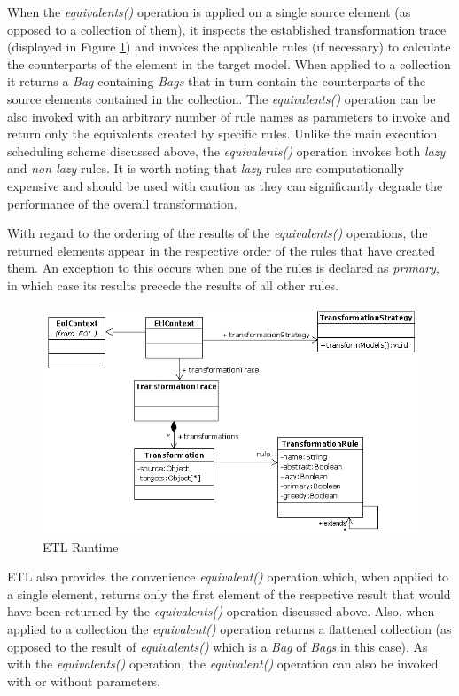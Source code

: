 When the \emph{equivalents()} operation is applied on a single source element (as opposed to a collection of them), it inspects the established transformation trace (displayed in Figure \ref{fig:EtlRuntime}) and invokes the applicable rules (if necessary) to calculate the counterparts of the element in the target model. When applied to a collection it returns a \emph{Bag} containing \emph{Bags} that in turn contain the counterparts of the source elements contained in the collection. The \emph{equivalents()} operation can be also invoked with an arbitrary number of rule names as parameters to invoke and return only the equivalents created by specific rules. Unlike the main execution scheduling scheme discussed above, the \emph{equivalents()} operation invokes both \emph{lazy} and \emph{non-lazy} rules. It is worth noting that \emph{lazy} rules are computationally expensive and should be used with caution as they can significantly degrade the performance of the overall transformation.

With regard to the ordering of the results of the \emph{equivalents()} operations, the returned elements appear in the respective order of the rules that have created them. An exception to this occurs when one of the rules is declared as \emph{primary}, in which case its results precede the results of all other rules.

\begin{figure}
	\centering
		\includegraphics{images/EtlRuntime.png}
	\caption{ETL Runtime}
	\label{fig:EtlRuntime}
\end{figure}


ETL also provides the convenience \emph{equivalent()} operation which, when applied to a single element, returns only the first element of the respective result that would have been returned by the \emph{equivalents()} operation discussed above. Also, when applied to a collection the \emph{equivalent()} operation returns a flattened collection (as opposed to the result of \emph{equivalents()} which is a \emph{Bag} of \emph{Bags} in this case). As with the \emph{equivalents()} operation, the \emph{equivalent()} operation can also be invoked with or without parameters.


